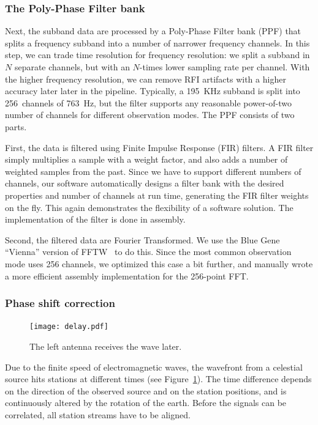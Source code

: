 \documentclass{sig-alternate}
\begin{document}
\subsubsection{The Poly-Phase Filter bank}
Next, the subband data are processed by a Poly-Phase Filter
bank (PPF) that splits a frequency subband into a number of
narrower frequency channels.  In this step, we can trade time
resolution for frequency resolution: we split a subband in $N$
separate channels, but with an $N$-times lower sampling rate per channel.  With
the higher frequency resolution, we can remove RFI artifacts with a
higher accuracy later later in the pipeline.
Typically, a 195~KHz subband is split into 256~channels of 763~Hz, but the
filter supports any reasonable power-of-two number of channels for different
observation modes. The PPF consists of two parts. 

First, the data is filtered using Finite Impulse Response (FIR)
filters. A FIR filter simply multiplies a sample with a weight factor, and
also adds a number of weighted samples from the past.  Since we have
to support different numbers of channels, our software automatically designs
a filter bank with the desired properties and number of channels at
run time, generating the FIR filter weights on the fly. This again
demonstrates the flexibility of a software solution.  The
implementation of the filter is done in assembly.

Second, the filtered data are Fourier Transformed. We use the Blue
Gene ``Vienna'' version of FFTW~\cite{Lorenz:05} to do this. Since the
most common observation mode uses 256 channels, we optimized this case
a bit further, and manually wrote a more efficient assembly
implementation for the 256-point FFT.


\subsubsection{Phase shift correction}

\begin{figure}[ht]
\begin{center}
\texttt{[image: delay.pdf]}
\end{center}
\vspace{-0.5cm}
\caption{The left antenna receives the wave later.}
\label{fig:delay}
\end{figure}

Due to the finite speed
of electromagnetic waves, the wavefront from a celestial source hits
stations at different times (see Figure~\ref{fig:delay}).  The time
difference depends on the direction of the observed source and on the
station positions, and is continuously altered by the rotation of the
earth.  Before the signals can be correlated, all station streams have
to be aligned.
\end{document}
